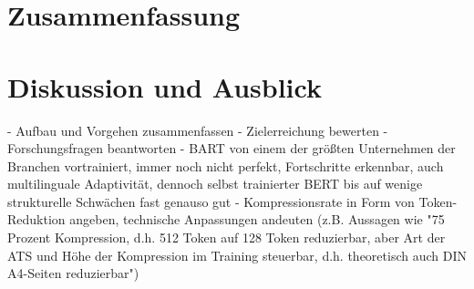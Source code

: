\chapter{Zusammenfassung}
\thispagestyle{fancy}
\label{chap:Zusammenfassung}

\chapter{Diskussion und Ausblick}
\thispagestyle{fancy}
\label{chap:Diskussion und Ausblick}

- Aufbau und Vorgehen zusammenfassen
- Zielerreichung bewerten
- Forschungsfragen beantworten
- BART von einem der größten Unternehmen der Branchen vortrainiert, immer noch nicht perfekt, Fortschritte erkennbar, auch multilinguale Adaptivität, dennoch selbst trainierter BERT bis auf wenige strukturelle Schwächen fast genauso gut
- Kompressionsrate in Form von Token-Reduktion angeben, technische Anpassungen andeuten (z.B. Aussagen wie "75 Prozent Kompression, d.h. 512 Token auf 128 Token reduzierbar, aber Art der ATS und Höhe der Kompression im Training steuerbar, d.h. theoretisch auch DIN A4-Seiten reduzierbar")
